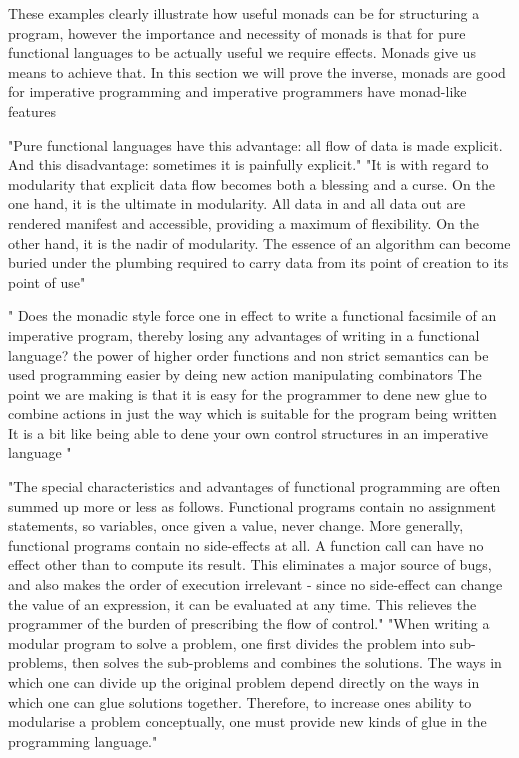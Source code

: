 These examples clearly illustrate how useful monads can be for structuring a program,
however the importance and necessity of monads is that for pure functional languages
to be actually useful we require effects. Monads give us means to achieve that.
In this section we will prove the inverse,
monads are good for imperative programming
and imperative programmers have monad-like features

"Pure functional languages have this advantage:
all flow of data is made explicit. And this disadvantage: sometimes it is painfully explicit."
"It is with regard to modularity that explicit data flow becomes both a blessing and a curse.
On the one hand, it is the ultimate in modularity.
All data in and all data out are rendered manifest and accessible, providing a maximum of flexibility. On the other hand, it is the nadir of modularity. The essence of an algorithm can become buried under the plumbing required to carry data from its point of creation to its point of use"
\cite{wadler1995monads}

"
Does the monadic style force one in effect to write a functional facsimile of an
imperative program, thereby losing any advantages of writing in a functional language?
the power of higher order functions and non strict semantics can be used
programming easier by deing new action manipulating combinators
The point we are making is that it is easy for the programmer to dene new glue to
combine actions in just the way which is suitable for the program being written
It is a bit like being able to dene your own control structures in an imperative language
"\cite{PeytonJones:1993}

"The special characteristics and advantages of functional programming are often summed up more or less as follows. Functional programs contain no assignment statements, so variables, once given a value, never change. More generally, functional programs contain no side-effects at all. A function call can have no effect other than to compute its result. This eliminates a major source of bugs, and also makes the order of execution irrelevant - since no side-effect can change the value of an expression, it can be evaluated at any time. This relieves the programmer of the burden of prescribing the flow of control."
"When writing a modular program to solve a problem, one first divides the problem into sub- problems, then solves the sub-problems and combines the solutions. The ways in which one can divide up the original problem depend directly on the ways in which one can glue solutions together. Therefore, to increase ones ability to modularise a problem conceptually, one must provide new kinds of glue in the programming language."
\cite{hughes1989functional}

